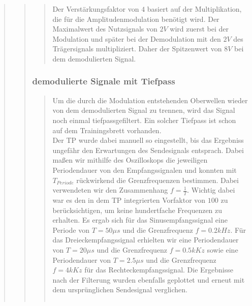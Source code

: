 \begin{quote}
\begin{quote}
\begin{quote}
                    Der Verstärkungsfaktor von $4$ basiert auf der
                    Multiplikation, die für die Amplitudenmodulation benötigt wird. 
                    Der Maximalwert des Nutzsignals von $2V$ wird zuerst bei der Modulation und später
                    bei der Demodulation mit den $2V$ des Trägersignals multipliziert. Daher der Spitzenwert von $8V$
                    bei dem demodulierten Signal.\\
                    
     			
		\end{quote}
		
		\subsubsection{demodulierte Signale mit Tiefpass}
		\begin{quote}
                    Um die durch die Modulation entstehenden Oberwellen wieder von dem demodulierten Signal zu
                    trennen, wird das Signal noch einmal tiefpassgefiltert. Ein
                    solcher Tiefpass ist schon auf dem Trainingsbrett vorhanden.\\
                    Der TP wurde dabei manuell so eingestellt, bis das Ergebniss ungefähr 
                    den Erwartungen des Sendesignals entsprach. Dabei maßen wir
                    mithilfe des Oszilloskops die jeweiligen Periodendauer von den
                    Empfangssignalen und konnten mit $T_{Periode}$ rückwirkend die
                    Grenzfrequenzen bestimmen. Dabei verwendeten wir den
                    Zusammenhang $f = \frac{1}{T}$. Wichtig dabei war es den in dem
                    TP integrierten Vorfaktor von $100$ zu berücksichtigen, um keine 
                    hundertfache Frequenzen zu erhalten. Es ergab sich für das
                    Sinusempfangssignal eine Periode von $T = 50\mu s$ und die
                    Grenzfrequenz $f = 0.2 kHz$. Für das Dreieckempfangssignal
                    erhielten wir eine Periodendauer von $T = 20\mu s$ und die Grenzfrequenz
                    $f = 0.5 kKz$ sowie eine Periodendauer von $T = 2.5\mu s$ und
                    die Grenzfrequenz $f = 4 kKz$ für das Rechteckempfangssignal.
                    Die Ergebnisse nach der Filterung wurden ebenfalls geplottet und
                    erneut mit dem ursprünglichen Sendesignal verglichen.
                    
                    
       \begin{center}
                \begin{tabular}{ll}
    

\end{tabular}
\end{center}
\end{quote}
\end{quote}
\end{quote}
